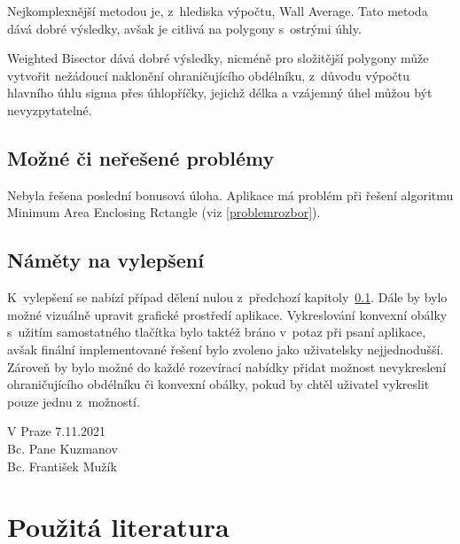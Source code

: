 \documentclass[a4paper, 12pt, oneside, titlepage]{article} %
\begin{document}
Nejkomplexnější metodou je, z~hlediska výpočtu, Wall Average. Tato metoda dává dobré výsledky, avšak je citlivá na polygony s~ostrými úhly. 

Weighted Bisector dává dobré výsledky, nicméně pro složitější polygony může vytvořit nežádoucí naklonění ohraničujícího obdélníku, z~důvodu výpočtu hlavního úhlu sigma přes úhlopříčky, jejichž délka a vzájemný úhel můžou být nevyzpytatelné.

\subsection{Možné či neřešené problémy} \label{mcn_problemy}
Nebyla řešena poslední bonusová úloha. Aplikace má problém při řešení algoritmu Minimum Area Enclosing Rctangle (viz \ref{problemrozbor}).

\subsection{Náměty na vylepšení} \label{vylepseni}
K~vylepšení se nabízí případ dělení nulou z~předchozí kapitoly~\ref{mcn_problemy}. Dále by bylo možné vizuálně upravit grafické prostředí aplikace. Vykreslování konvexní obálky s~užitím samostatného tlačítka bylo taktéž bráno v~potaz při psaní aplikace, avšak finální implementované řešení bylo zvoleno jako uživatelsky nejjednodušší. Zároveň by bylo možné do každé rozevírací nabídky přidat možnost nevykreslení ohraničujícího obdélníku či konvexní obálky, pokud by chtěl uživatel vykreslit pouze jednu z~možností. 


\begin{flushright}
V Praze 7.11.2021\\
\vspace{2mm}
Bc. Pane Kuzmanov\\
Bc. František Mužík\\
\end{flushright}


\clearpage 
\section*{Použitá literatura}
\renewcommand{\section}[2]{}%


\end{document}
